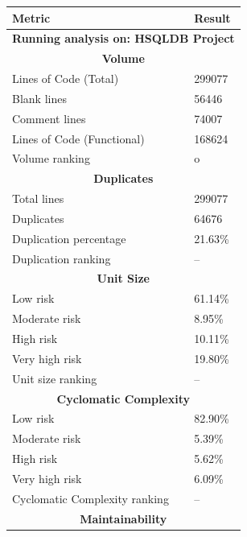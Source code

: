 \documentclass[11pt]{report}
\begin{document}
\begin{table}[H]
    \centering
    \begin{tabular}{|l|l|}
        \hline
        \textbf{Metric} & \textbf{Result} \\
        \hline
        \multicolumn{2}{|c|}{\textbf{Running analysis on: HSQLDB Project}} \\
        \hline
        \multicolumn{2}{|c|}{\textbf{Volume}} \\
        \hline
        Lines of Code (Total) & 299077 \\
        \hline
        Blank lines & 56446 \\
        \hline
        Comment lines & 74007 \\
        \hline
        Lines of Code (Functional) & 168624 \\
        \hline
        Volume ranking & o \\
        \hline
        \multicolumn{2}{|c|}{\textbf{Duplicates}} \\
        \hline
        Total lines & 299077 \\
        \hline
        Duplicates & 64676 \\
        \hline
        Duplication percentage & 21.63\% \\
        \hline
        Duplication ranking & -- \\
        \hline
        \multicolumn{2}{|c|}{\textbf{Unit Size}} \\
        \hline
        Low risk & 61.14\% \\
        \hline
        Moderate risk & 8.95\% \\
        \hline
        High risk & 10.11\% \\
        \hline
        Very high risk & 19.80\% \\
        \hline
        Unit size ranking & -- \\
        \hline
        \multicolumn{2}{|c|}{\textbf{Cyclomatic Complexity}} \\
        \hline
        Low risk & 82.90\% \\
        \hline
        Moderate risk & 5.39\% \\
        \hline
        High risk & 5.62\% \\
        \hline
        Very high risk & 6.09\% \\
        \hline
        Cyclomatic Complexity ranking & -- \\
        \hline
        \multicolumn{2}{|c|}{\textbf{Maintainability}} \\

\end{tabular}
\end{table}
\end{document}

